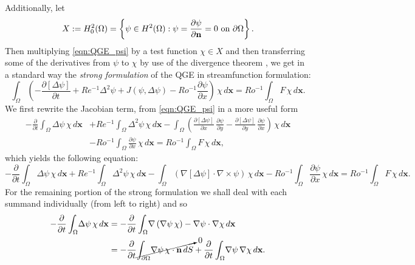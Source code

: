 Additionally, let
\begin{equation*}
  X := H^2_0(\Omega) = \left\{ \psi\in H^2(\Omega): \psi=\frac{\partial\psi}{\partial {\bf n}}=0
    \text{ on } \partial\Omega \right\}.
\end{equation*}
Then multiplying \eqref{eqn:QGE_psi} by a test function $\chi \in X$ and then
transferring some of the derivatives from $\psi$ to $\chi$ by use of the
divergence theorem , we get in a standard way the \emph{strong formulation} of
the QGE in streamfunction formulation:
\begin{equation*}
  \int_{\Omega}\! \left(-\frac{\partial \left[ \Delta \psi \right]}{\partial t} + Re^{-1}
    \Delta^2 \psi +  J(\psi,\Delta \psi) - Ro^{-1}\frac{\partial \psi}{\partial
    x}\right)\, \chi \, d\mathbf{x} = Ro^{-1} \int_{\Omega}\! F\, \chi \,
    d\mathbf{x}.
\end{equation*}
We first rewrite the Jacobian term, from \eqref{eqn:QGE_psi} in a more useful
form
\begin{align*}
  -\frac{\partial}{\partial t} \int_{\Omega}\! \Delta \psi \, \chi \, d\mathbf{x}
    &+ Re^{-1} \int_{\Omega}\! \Delta^2 \psi\, \chi \, d\mathbf{x}
    - \int_{\Omega}\! \left(\frac{\partial\left[\Delta\psi \right]}{\partial x}\, \frac{\partial
      \psi}{\partial y} -
    \frac{\partial\left[ \Delta\psi \right]}{\partial y}\,
    \frac{\partial \psi}{\partial x}\right)\, \chi\, d\mathbf{x} \\
    &- Ro^{-1} \int_{\Omega}\! \frac{\partial \psi}{\partial x}\, \chi \, d\mathbf{x}
    = Ro^{-1} \int_{\Omega}\! F\, \chi \, d\mathbf{x},
\end{align*}
which yields the following equation:
\begin{equation*}
  -\frac{\partial}{\partial t} \int_{\Omega}\! \Delta \psi \, \chi \, d\mathbf{x}
    + Re^{-1} \int_{\Omega}\! \Delta^2 \psi\, \chi \, d\mathbf{x}
    - \int_{\Omega}\! \left(\nabla \left[\Delta\psi\right]\cdot \nabla \times
    \psi \right)\, \chi\,
    d\mathbf{x} -Ro^{-1} \int_{\Omega}\! \frac{\partial \psi}{\partial x}\,
    \chi \, d\mathbf{x} = Ro^{-1} \int_{\Omega}\! F\, \chi \, d\mathbf{x}.
\end{equation*}
For the remaining portion of the strong formulation we shall deal with each
summand individually (from left to right) and so
\begin{align*}
  -\frac{\partial}{\partial t} \int_{\Omega}\! \Delta \psi\, \chi \, d\mathbf{x} &=
    -\frac{\partial}{\partial t} \int_{\Omega}\! \nabla \left( \nabla \psi \, \chi \right) -
    \nabla \psi \cdot \nabla \chi \, d\mathbf{x} \\
  &= -\frac{\partial}{\partial t} \cancelto{0}{\int_{\partial \Omega}\! \nabla \psi \, \chi
    \cdot \mathbf{n} \, dS} + \frac{\partial}{\partial t} \int_{\Omega}\! \nabla
    \psi\, \nabla \chi \, d\mathbf{x}.
\end{align*}
